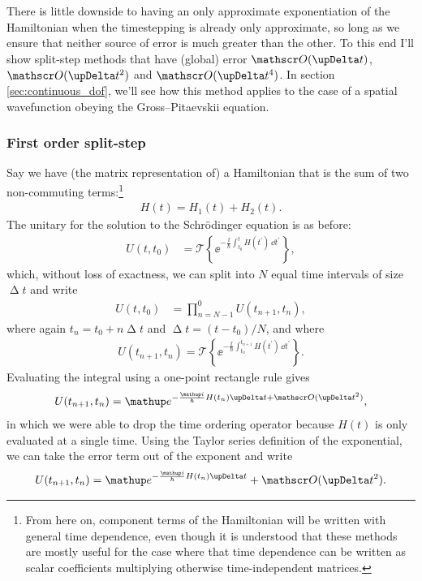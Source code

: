 There is little downside to having an only approximate exponentiation of the Hamiltonian when the timestepping is already only approximate, so long as we ensure that neither source of error is much greater than the other. To this end I'll show split-step methods that have (global) error $\Ord{\upDelta t}$, $\Ord{\upDelta t^2}$ and $\Ord{\upDelta t^4}$. In section \ref{sec:continuous_dof}, we'll see how this method applies to the case of a spatial wavefunction obeying the Gross--Pitaevskii equation.

\subsubsection{First order split-step}
Say we have (the matrix representation of) a Hamiltonian that is the sum of two non-commuting terms:\footnote{From here on, component terms of the Hamiltonian will be written with general time dependence, even though it is understood that these methods are mostly useful for the case where that time dependence can be written as scalar coefficients multiplying otherwise time-independent matrices.}
\begin{align}
H(t) = H_1(t) + H_2(t).
\end{align}
The unitary for the solution to the Schr\"odinger equation is as before:
\begin{align}
U(t, t_0) &= \mathcal{T}\left\{\ee^{-\frac \ii \hbar \int_{t_0}^t H(t^\prime)\,\dd t^\prime}\right\},
\end{align}
which, without loss of exactness, we can split into $N$ equal time intervals of size $\upDelta t$ and write
\begin{align}
U(t, t_0) &= \prod_{n=N-1}^0 U(t_{n+1}, t_n),
\end{align}
where again $t_n = t_0 + n\upDelta t$ and $\upDelta t = (t - t_0)/N$, and where
\begin{align}\label{eq:U_singlestep_exact}
U(t_{n+1}, t_n) = \mathcal{T}\left\{\ee^{-\frac \ii \hbar \int_{t_n}^{t_{n+1}} H(t^\prime)\,\dd t^\prime}\right\}.
\end{align}
Evaluating the integral using a one-point rectangle rule gives
\begin{align}
U(t_{n+1}, t_n) = \ee^{-\frac \ii \hbar H(t_n)\upDelta t + \Ord{\upDelta t^2}},
\end{align}
in which we were able to drop the time ordering operator because $H(t)$ is only evaluated at a single time. Using the Taylor series definition of the exponential, we can take the error term out of the exponent and write
\begin{align}\label{eq:integration_error}
U(t_{n+1}, t_n) = \ee^{-\frac \ii \hbar H(t_n)\upDelta t} + \Ord{\upDelta t^2}.
\end{align}

